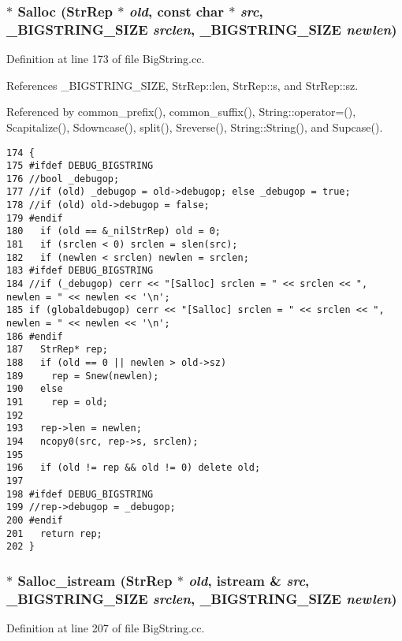 \subsubsection{$\ast$ Salloc ({\bf Str\-Rep} $\ast$ {\em old}, const char $\ast$ {\em src}, {\bf \_\-BIGSTRING\_\-SIZE} {\em srclen}, {\bf \_\-BIGSTRING\_\-SIZE} {\em newlen})}\label{BigString_8cc_a15}




Definition at line 173 of file Big\-String.cc.

References \_\-BIGSTRING\_\-SIZE, Str\-Rep::len, Str\-Rep::s, and Str\-Rep::sz.

Referenced by common\_\-prefix(), common\_\-suffix(), String::operator=(), Scapitalize(), Sdowncase(), split(), Sreverse(), String::String(), and Supcase().



\footnotesize\begin{verbatim}174 {
175 #ifdef DEBUG_BIGSTRING
176 //bool _debugop;
177 //if (old) _debugop = old->debugop; else _debugop = true;
178 //if (old) old->debugop = false;
179 #endif
180   if (old == &_nilStrRep) old = 0;
181   if (srclen < 0) srclen = slen(src);
182   if (newlen < srclen) newlen = srclen;
183 #ifdef DEBUG_BIGSTRING
184 //if (_debugop) cerr << "[Salloc] srclen = " << srclen << ", newlen = " << newlen << '\n';
185 if (globaldebugop) cerr << "[Salloc] srclen = " << srclen << ", newlen = " << newlen << '\n';
186 #endif
187   StrRep* rep;
188   if (old == 0 || newlen > old->sz)
189     rep = Snew(newlen);
190   else
191     rep = old;
192 
193   rep->len = newlen;
194   ncopy0(src, rep->s, srclen);
195 
196   if (old != rep && old != 0) delete old;
197 
198 #ifdef DEBUG_BIGSTRING
199 //rep->debugop = _debugop;
200 #endif
201   return rep;
202 }
\end{verbatim}\normalsize 
{}
\subsubsection{$\ast$ Salloc\_\-istream ({\bf Str\-Rep} $\ast$ {\em old}, istream \& {\em src}, {\bf \_\-BIGSTRING\_\-SIZE} {\em srclen}, {\bf \_\-BIGSTRING\_\-SIZE} {\em newlen})}\label{BigString_8cc_a16}




Definition at line 207 of file Big\-String.cc.

